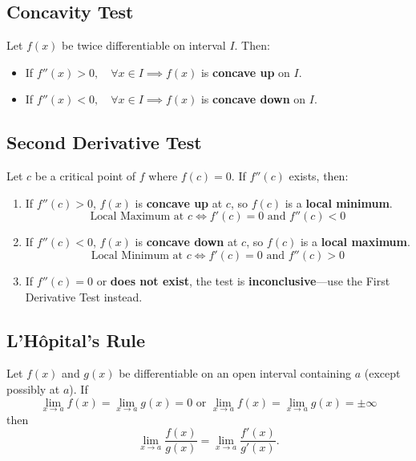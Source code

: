 \documentclass[a4paper,11pt]{article}
\begin{document}


\subsection{Concavity Test}

\begin{tcolorbox}
    Let $f(x)$ be twice differentiable on interval $I$. Then:
    \begin{itemize}
        \item If $f''(x) > 0, \quad \forall x \in I \implies f(x)$ is \textbf{concave up} on $I$.
        \item If $f''(x) < 0, \quad \forall x \in I \implies f(x)$ is \textbf{concave down} on $I$.
    \end{itemize}
\end{tcolorbox}




\subsection{Second Derivative Test}

\begin{tcolorbox}
    Let $c$ be a critical point of $f$ where $f(c)=0$. If $f''(c)$ exists, then:
    \begin{enumerate}
        \item If $f''(c) > 0$, $f(x)$ is \textbf{concave up} at $c$, so $f(c)$ is a \textbf{local minimum}.
        \[ \text{Local Maximum at $c$} \iff f'(c) = 0 \text{ and } f''(c) < 0 \]
        \item If $f''(c) < 0$, $f(x)$ is \textbf{concave down} at $c$, so $f(c)$ is a \textbf{local maximum}.
        \[ \text{Local Minimum at $c$} \iff f'(c) = 0 \text{ and } f''(c) > 0 \]
        \item If $f''(c) = 0$ or \textbf{does not exist}, the test is \textbf{inconclusive}---use the First Derivative Test instead.
    \end{enumerate}
\end{tcolorbox}




\subsection{L'Hôpital's Rule}

\begin{tcolorbox}
    Let $f(x)$ and $g(x)$ be differentiable on an open interval containing $a$ (except possibly at $a$). If 
    \[ 
    \lim_{x \to a} f(x) = \lim_{x \to a} g(x) = 0 \text{ or } \lim_{x \to a} f(x) = \lim_{x \to a} g(x) = \pm \infty 
    \]
    then
    \[
    \lim_{x \to a} \frac{f(x)}{g(x)} = \lim_{x \to a} \frac{f'(x)}{g'(x)}.
    \]
\end{tcolorbox}
\end{document}
